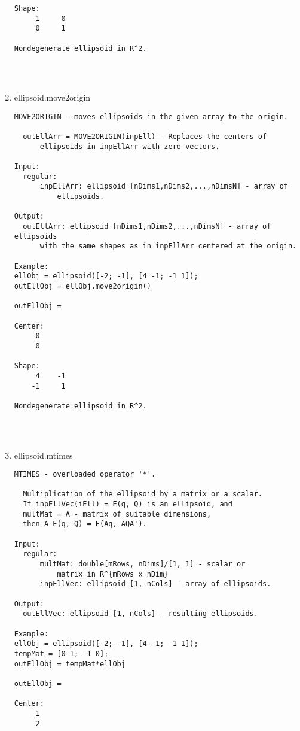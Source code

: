 \begin{enumerate}
\begin{lstlisting}
Shape:
     1     0
     0     1

Nondegenerate ellipsoid in R^2.




\end{lstlisting}
\fontfamily{\familydefault}
\selectfont
\item {ellipsoid.move2origin}
\selectfont
\begin{lstlisting}
MOVE2ORIGIN - moves ellipsoids in the given array to the origin.

  outEllArr = MOVE2ORIGIN(inpEll) - Replaces the centers of
      ellipsoids in inpEllArr with zero vectors.

Input:
  regular:
      inpEllArr: ellipsoid [nDims1,nDims2,...,nDimsN] - array of
          ellipsoids.

Output:
  outEllArr: ellipsoid [nDims1,nDims2,...,nDimsN] - array of ellipsoids
      with the same shapes as in inpEllArr centered at the origin.

Example:
ellObj = ellipsoid([-2; -1], [4 -1; -1 1]);
outEllObj = ellObj.move2origin()

outEllObj =

Center:
     0
     0

Shape:
     4    -1
    -1     1

Nondegenerate ellipsoid in R^2.




\end{lstlisting}
\fontfamily{\familydefault}
\selectfont
\item {ellipsoid.mtimes}
\selectfont
\begin{lstlisting}
MTIMES - overloaded operator '*'.

  Multiplication of the ellipsoid by a matrix or a scalar.
  If inpEllVec(iEll) = E(q, Q) is an ellipsoid, and
  multMat = A - matrix of suitable dimensions,
  then A E(q, Q) = E(Aq, AQA').

Input:
  regular:
      multMat: double[mRows, nDims]/[1, 1] - scalar or
          matrix in R^{mRows x nDim}
      inpEllVec: ellipsoid [1, nCols] - array of ellipsoids.

Output:
  outEllVec: ellipsoid [1, nCols] - resulting ellipsoids.

Example:
ellObj = ellipsoid([-2; -1], [4 -1; -1 1]);
tempMat = [0 1; -1 0];
outEllObj = tempMat*ellObj

outEllObj =

Center:
    -1
     2


\end{lstlisting}
\end{enumerate}
